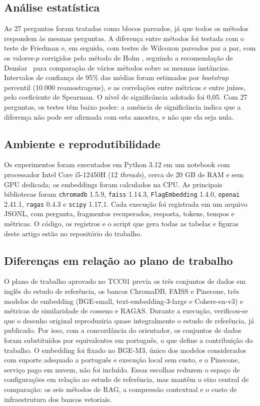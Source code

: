 \subsection{Análise estatística}

As 27 perguntas foram tratadas como blocos pareados, já que todos os métodos respondem às mesmas perguntas. A diferença entre métodos foi testada com o teste de Friedman e, em seguida, com testes de Wilcoxon pareados par a par, com os valores-$p$ corrigidos pelo método de Holm \cite{holm1979simple}, seguindo a recomendação de Demšar~\cite{demsar2006statistical} para comparação de vários métodos sobre as mesmas instâncias. Intervalos de confiança de 95\% das médias foram estimados por \emph{bootstrap} percentil (10.000 reamostragens), e as correlações entre métricas e entre juízes, pelo coeficiente de Spearman. O nível de significância adotado foi 0,05. Com 27 perguntas, os testes têm baixo poder: a ausência de significância indica que a diferença não pode ser afirmada com esta amostra, e não que ela seja nula.

\subsection{Ambiente e reprodutibilidade}

Os experimentos foram executados em Python 3.12 em um notebook com processador Intel Core i5-12450H (12 \emph{threads}), cerca de 20 GB de RAM e sem GPU dedicada; os embeddings foram calculados na CPU. As principais bibliotecas foram \texttt{chromadb} 1.5.9, \texttt{faiss} 1.14.3, \texttt{FlagEmbedding} 1.4.0, \texttt{openai} 2.41.1, \texttt{ragas} 0.4.3 e \texttt{scipy} 1.17.1. Cada execução foi registrada em um arquivo JSONL, com pergunta, fragmentos recuperados, resposta, tokens, tempos e métricas. O código, os registros e o script que gera todas as tabelas e figuras deste artigo estão no repositório do trabalho.

\subsection{Diferenças em relação ao plano de trabalho}

O plano de trabalho aprovado no TCC01 previa os três conjuntos de dados em inglês do estudo de referência, os bancos ChromaDB, FAISS e Pinecone, três modelos de embedding (BGE-small, text-embedding-3-large e Cohere-en-v3) e métricas de similaridade de cosseno e RAGAS. Durante a execução, verificou-se que o desenho original reproduziria quase integralmente o estudo de referência, já publicado. Por isso, com a concordância do orientador, os conjuntos de dados foram substituídos por equivalentes em português, o que define a contribuição do trabalho. O embedding foi fixado no BGE-M3, único dos modelos considerados com suporte adequado a português e execução local sem custo, e o Pinecone, serviço pago em nuvem, não foi incluído. Essas escolhas reduzem o espaço de configurações em relação ao estudo de referência, mas mantêm o eixo central de comparação: os seis métodos de RAG, a compressão contextual e o custo de infraestrutura dos bancos vetoriais.
